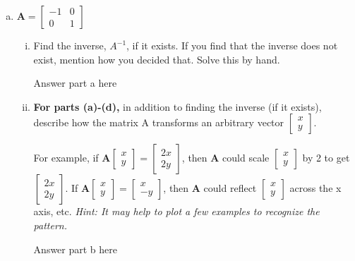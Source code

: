 \documentclass[11pt]{article}
\def\A{\textbf{A}} %
\begin{document}
\begin{enumerate}
\begin{enumerate}[(a)]
	      	\newpage
	      	\item $\A = \begin{bmatrix}
	      	      -1 & 0 \\
	      	      0 & 1
	      	\end{bmatrix}$
	      	\begin{enumerate}[i.]
	      		\item Find the inverse, $A^{-1}$, if it exists. If you find that the inverse does not exist, mention how you decided that. Solve this by hand.
	      		      \begin{Answer}
	      		      	Answer part a here
	      		      \end{Answer}
	      		\item \textbf{For parts (a)-(d),} in addition to finding the inverse (if it exists), describe how the matrix A transforms an arbitrary vector $\begin{bmatrix}
	      		      x \\
	      		      y
	      		\end{bmatrix}$.
	      			      		                    
	      		For example, if $\A \begin{bmatrix}
	      		x \\
	      		y
	      		\end{bmatrix} = \begin{bmatrix}
	      		2x \\
	      		2y
	      		\end{bmatrix}$, then $\A$ could scale $\begin{bmatrix}
	      		x \\
	      		y
	      		\end{bmatrix}$ by 2 to get $\begin{bmatrix}
	      		2x \\
	      		2y
	      		\end{bmatrix}$. If $\A \begin{bmatrix}
	      		x \\
	      		y
	      		\end{bmatrix}
	      		=
	      		\begin{bmatrix}
	      			x  \\
	      			-y 
	      		\end{bmatrix}$, then $\A$ could reflect $\begin{bmatrix}
	      		x \\
	      		y
	      		\end{bmatrix}$ across the x axis, etc. \textit{Hint: It may help to plot a few examples to recognize the pattern.}
	      		\begin{Answer}
	      			Answer part b here
	      		\end{Answer}
	      	\end{enumerate}
	      		      	

\end{enumerate}
\end{enumerate}
\end{document}
